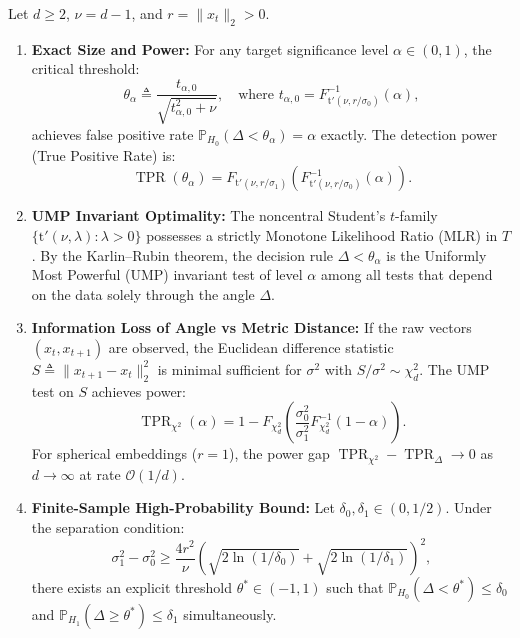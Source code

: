 \begin{theorem}
\label{thm:detection_guarantee}
Let $d \ge 2$, $\nu = d - 1$, and $r = \|x_t\|_2 > 0$.
\begin{enumerate}
    \item \textbf{Exact Size and Power:} For any target significance level $\alpha \in (0, 1)$, the critical threshold:
    \begin{equation}
    \label{eq:critical_threshold}
    \theta_\alpha \triangleq \frac{t_{\alpha, 0}}{\sqrt{t_{\alpha, 0}^2 + \nu}}, \quad \text{where } t_{\alpha, 0} = F_{\mathrm{t}'(\nu, r/\sigma_0)}^{-1}(\alpha),
    \end{equation}
    achieves false positive rate $\mathbb{P}_{H_0}(\Delta < \theta_\alpha) = \alpha$ exactly. The detection power (True Positive Rate) is:
    \begin{equation}
    \label{eq:power_exact}
    \operatorname{TPR}(\theta_\alpha) = F_{\mathrm{t}'(\nu, r/\sigma_1)}\left( F_{\mathrm{t}'(\nu, r/\sigma_0)}^{-1}(\alpha) \right).
    \end{equation}

    \item \textbf{UMP Invariant Optimality:} The noncentral Student's $t$-family $\{\mathrm{t}'(\nu, \lambda) : \lambda > 0\}$ possesses a strictly Monotone Likelihood Ratio (MLR) in $T$. By the Karlin--Rubin theorem, the decision rule $\Delta < \theta_\alpha$ is the Uniformly Most Powerful (UMP) invariant test of level $\alpha$ among all tests that depend on the data solely through the angle $\Delta$.

    \item \textbf{Information Loss of Angle vs Metric Distance:} If the raw vectors $(x_t, x_{t+1})$ are observed, the Euclidean difference statistic $S \triangleq \|x_{t+1} - x_t\|_2^2$ is minimal sufficient for $\sigma^2$ with $S / \sigma^2 \sim \chi^2_d$. The UMP test on $S$ achieves power:
    \begin{equation}
    \operatorname{TPR}_{\chi^2}(\alpha) = 1 - F_{\chi^2_d}\left( \frac{\sigma_0^2}{\sigma_1^2} F_{\chi^2_d}^{-1}(1 - \alpha) \right).
    \end{equation}
    For spherical embeddings ($r = 1$), the power gap $\operatorname{TPR}_{\chi^2} - \operatorname{TPR}_{\Delta} \to 0$ as $d \to \infty$ at rate $\mathcal{O}(1/d)$.

    \item \textbf{Finite-Sample High-Probability Bound:} Let $\delta_0, \delta_1 \in (0, 1/2)$. Under the separation condition:
    \begin{equation}
    \label{eq:separation_condition}
    \sigma_1^2 - \sigma_0^2 \ge \frac{4 r^2}{\nu} \left( \sqrt{2 \ln(1/\delta_0)} + \sqrt{2 \ln(1/\delta_1)} \right)^2,
    \end{equation}
    there exists an explicit threshold $\theta^* \in (-1, 1)$ such that $\mathbb{P}_{H_0}(\Delta < \theta^*) \le \delta_0$ and $\mathbb{P}_{H_1}(\Delta \ge \theta^*) \le \delta_1$ simultaneously.


\end{enumerate}
\end{theorem}
